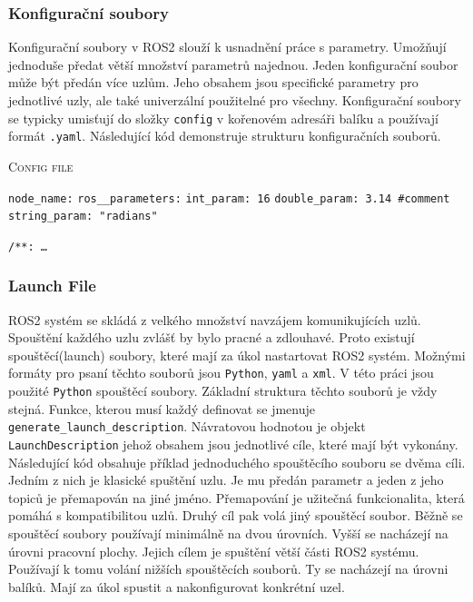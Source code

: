 \subsubsection*{Konfigurační soubory}
Konfigurační soubory v ROS2 slouží k usnadnění práce s parametry. Umožňují jednoduše předat větší množství parametrů najednou. Jeden konfigurační soubor může být předán více uzlům. Jeho obsahem jsou specifické parametry pro jednotlivé uzly, ale také univerzální použitelné pro všechny. Konfigurační soubory se typicky umisťují do složky \verb|config| v kořenovém adresáři balíku a používají formát \verb|.yaml|. Následující kód demonstruje strukturu konfiguračních souborů. \cite{ros2_documentation}

\begin{algorithm}[h!]
	\label{}
	\caption{\textsc{Config file}}
	
	\DontPrintSemicolon
	\SetAlgoNoLine
	\SetNlSty{}{}{:}
	\SetNlSkip{-1.1em}
	
	\BlankLine \Indp\Indpp
	
	\texttt{node\_name:}\;
	\Indp
	\texttt{ros\_\_parameters:}\;
	\Indp
	\texttt{int\_param: 16}\;
	\texttt{double\_param: 3.14 \#comment}\;
	\texttt{string\_param: "radians"}\;
	
	
	\BlankLine \Indm\Indm
	\texttt{/**: \dots}\;
	
\end{algorithm}

\subsubsection*{Launch File}
ROS2 systém se skládá z velkého množství navzájem komunikujících uzlů. Spouštění každého uzlu zvlášť by bylo pracné a zdlouhavé. Proto existují spouštěcí(launch) soubory, které mají za úkol nastartovat ROS2 systém. Možnými formáty pro psaní těchto souborů jsou \verb|Python|, \verb|yaml| a \verb|xml|. V této práci jsou použité \verb|Python| spouštěcí soubory. Základní struktura těchto souborů je vždy stejná. Funkce, kterou musí každý definovat se jmenuje \verb|generate_launch_description|. Návratovou hodnotou je objekt \verb|LaunchDescription| jehož obsahem jsou jednotlivé cíle, které mají být vykonány. Následující kód obsahuje příklad jednoduchého spouštěcího souboru se dvěma cíli. Jedním z nich je klasické spuštění uzlu. Je mu předán parametr a jeden z jeho topiců je přemapován na jiné jméno. Přemapování je užitečná funkcionalita, která pomáhá s kompatibilitou uzlů. Druhý cíl pak volá jiný spouštěcí soubor. Běžně se spouštěcí soubory používají minimálně na dvou úrovních. Vyšší se nacházejí na úrovni pracovní plochy. Jejich cílem je spuštění větší části ROS2 systému. Používají k tomu volání nižších spouštěcích souborů. Ty se nacházejí na úrovni balíků. Mají za úkol spustit a nakonfigurovat konkrétní uzel. \cite[str:~35-37]{ros2_introduction}

